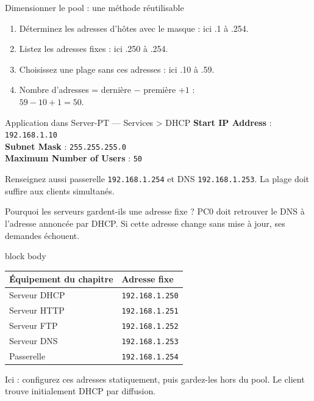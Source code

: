 \documentclass[aspectratio=169,11pt]{beamer}
\begin{document}
\begin{frame}{Dimensionner le pool : une méthode réutilisable}
  \begin{enumerate}
    \item Déterminez les adresses d'hôtes avec le masque : ici .1 à .254.
    \item Listez les adresses fixes : ici .250 à .254.
    \item Choisissez une plage sans ces adresses : ici .10 à .59.
    \item Nombre d'adresses = dernière $-$ première $+ 1$ :\\
      $59 - 10 + 1 = 50$.
  \end{enumerate}
  \begin{block}{Application dans Server-PT — Services > DHCP}
    \textbf{Start IP Address} : \texttt{192.168.1.10}\\
    \textbf{Subnet Mask} : \texttt{255.255.255.0}\\
    \textbf{Maximum Number of Users} : \texttt{50}
  \end{block}
  \small Renseignez aussi passerelle \texttt{192.168.1.254}
  et DNS \texttt{192.168.1.253}. La plage doit suffire aux clients simultanés.
\end{frame}

\begin{frame}{Pourquoi les serveurs gardent-ils une adresse fixe ?}
  PC0 doit retrouver le DNS à l'adresse annoncée par DHCP.
  Si cette adresse change sans mise à jour, ses demandes échouent.
  \renewcommand{\arraystretch}{1.25}
  \begin{beamercolorbox}[sep=8pt]{block body}
  \centering
  \begin{tabular}{ll}
    \textbf{Équipement du chapitre} & \textbf{Adresse fixe}\\\hline
    Serveur DHCP & \texttt{192.168.1.250}\\
    Serveur HTTP & \texttt{192.168.1.251}\\
    Serveur FTP & \texttt{192.168.1.252}\\
    Serveur DNS & \texttt{192.168.1.253}\\
    Passerelle & \texttt{192.168.1.254}\\
  \end{tabular}
  \end{beamercolorbox}
  \small Ici : configurez ces adresses statiquement, puis gardez-les hors du pool.
  Le client trouve initialement DHCP par diffusion.
\end{frame}
\end{document}
